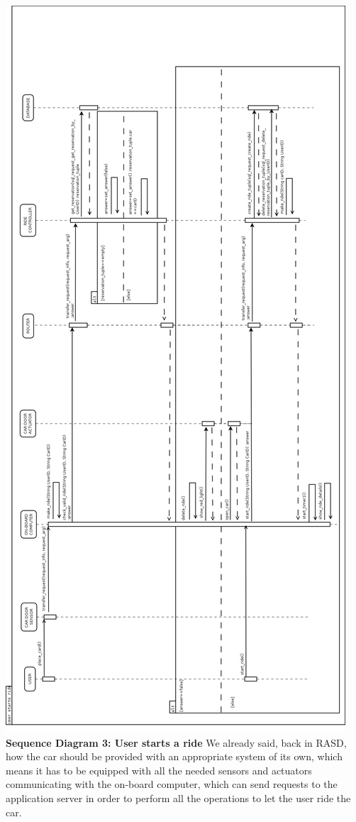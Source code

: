 \documentclass{article}
\begin{document}
\begin{flushleft}
\newpage
\includegraphics[scale=0.25]{seq3_start_ride} 
\newpage
\textbf{Sequence Diagram 3: User starts a ride}
\break
We already said, back in RASD, how the car should be provided with an appropriate system of its own, which means it has to be equipped with all the needed sensors and actuators communicating with the on-board computer, which can send requests to the application server in order to perform all the operations to let the user ride the car.\\

\end{flushleft}
\end{document}

